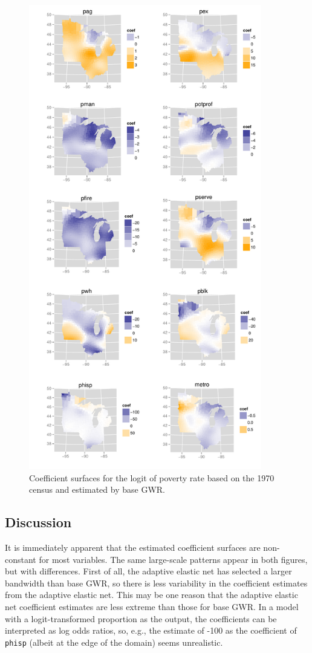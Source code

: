\documentclass[authoryear, review, 11pt]{elsarticle}
\begin{document}
	\begin{figure}
		\begin{center}
			\includegraphics[height=8in]{../../figures/poverty/1970-gwr.pdf}
			\caption{Coefficient surfaces for the logit of poverty rate based on the 1970 census and estimated by base GWR. \label{fig:gwr-coefs-1970}}
		\end{center}
	\end{figure}	
			
	\subsection{Discussion}
	It is immediately apparent that the estimated coefficient surfaces are non-constant for most variables. The same large-scale patterns appear in both figures, but with differences. First of all, the adaptive elastic net has selected a larger bandwidth than base GWR, so there is less variability in the coefficient estimates from the adaptive elastic net. This may be one reason that the adaptive elastic net coefficient estimates are less extreme than those for base GWR. In a model with a logit-transformed proportion as the output, the coefficients can be interpreted as log odds ratios, so, e.g., the estimate of -100 as the coefficient of \verb!phisp! (albeit at the edge of the domain) seems unrealistic.\\
	
\end{document}
